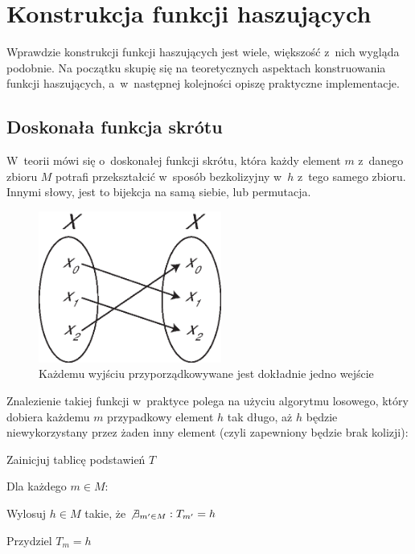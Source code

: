 \section{Konstrukcja funkcji haszujących}
\label{sec:hash_construction}
Wprawdzie konstrukcji funkcji haszujących jest wiele, większość z~nich wygląda
podobnie. Na początku skupię się na teoretycznych aspektach konstruowania
funkcji haszujących, a~w~następnej kolejności opiszę praktyczne implementacje.



\subsection{Doskonała funkcja skrótu}
W~teorii mówi się o~doskonałej funkcji skrótu, która każdy element $m$ z~danego
zbioru $M$ potrafi przekształcić w~sposób bezkolizyjny w~$h$ z~tego samego
zbioru. Innymi słowy, jest to bijekcja na samą siebie, lub permutacja.

\begin{figure}[htb!]
    \includegraphics[width=6cm]{img/injection_self.eps}
    \caption{Każdemu wyjściu przyporządkowywane jest dokładnie jedno wejście}
    \label{fig:bijection}
\end{figure}


Znalezienie takiej funkcji w~praktyce polega na użyciu algorytmu losowego,
który dobiera każdemu $m$ przypadkowy element $h$ tak długo, aż $h$ będzie
niewykorzystany przez żaden inny element (czyli zapewniony będzie brak
kolizji):

\begin{myenumerate}

    \item Zainicjuj tablicę podstawień $T$

    \item Dla każdego $m \in M$:

    \begin{myenumerate}

        \item Wylosuj $h \in M$ takie, że $\not \exists_{m' \in M} : T_{m'} =
        h$

        \item Przydziel $T_m = h$

    \end{myenumerate}

\end{myenumerate}


